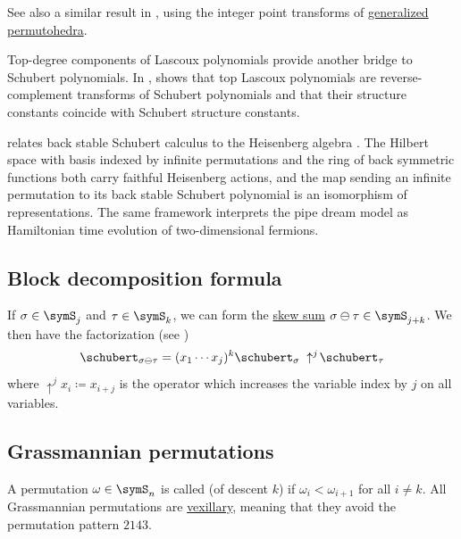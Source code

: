 See also a similar result in \cite{FinkMeszarosDizier2018},
using the integer point transforms of
\hyperref[generalizedPermutohedron]{generalized permutohedra}.

Top-degree components of Lascoux polynomials provide another bridge to
Schubert polynomials.  In \cite{Yu2025},  shows that
top Lascoux polynomials are reverse-complement transforms of Schubert
polynomials and that their structure constants coincide with Schubert
structure constants.

 relates back stable Schubert calculus to the
Heisenberg algebra \cite{Zhang2024x}.  The Hilbert space with basis indexed by
infinite permutations and the ring of back symmetric functions both carry
faithful Heisenberg actions, and the map sending an infinite permutation to
its back stable Schubert polynomial is an isomorphism of representations.
The same framework interprets the pipe dream model as Hamiltonian time
evolution of two-dimensional fermions.



\subsection[schubertBlockDecomposition]{Block decomposition formula}

If $\sigma \in \symS_j$ and $\tau \in \symS_{k}$,
we can form the \hyperref[directSumPermutations]{skew sum}
$\sigma \ominus \tau \in \symS_{j+k}$.
We then have the factorization (see \cite{BilleyJockuschStanley1993})
\[
 \schubert_{\sigma \ominus \tau}
 = (x_1 \dotsm x_j)^k \schubert_{\sigma}\;\uparrow^j\!\schubert_{\tau}
\]
where $\uparrow^j x_i \coloneqq x_{i+j}$ is the operator which
increases the variable index by $j$ on all variables.


\subsection[grassmannianPermutation]{Grassmannian permutations}

A permutation $\omega \in \symS_n$ is called  (of descent $k$)
if $\omega_i \lt \omega_{i+1}$ for all $i\neq k$.
All Grassmannian permutations are \hyperref[vexillary]{vexillary}, meaning that
they avoid the permutation pattern $2143$.

